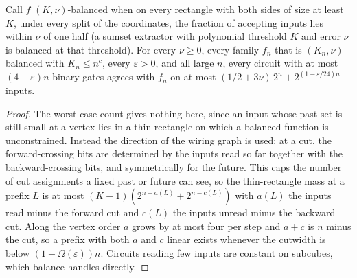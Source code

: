 \begin{theorem}
  \label{thm:lowerbounds-algebraic-cutwidth-average}
  \leanok
  Call $f$ $(K, \nu)$-balanced when on every rectangle with both sides of
  size at least $K$, under every split of the coordinates, the fraction of
  accepting inputs lies within $\nu$ of one half (a sumset extractor with
  polynomial threshold $K$ and error $\nu$ is balanced at that threshold).
  For every $\nu\ge0$, every family $f_n$ that is $(K_n, \nu)$-balanced
  with $K_n \le n^c$, every
  $\varepsilon > 0$, and all large $n$, every circuit with at most
  $(4 - \varepsilon)n$ binary gates agrees with $f_n$ on at most
  $(1/2 + 3\nu)\,2^n + 2^{(1 - \varepsilon/24)n}$ inputs.
\end{theorem}
\begin{proof}
  \leanok
  The worst-case count gives nothing here, since an input whose past set is
  still small at a vertex lies in a thin rectangle on which a balanced
  function is unconstrained. Instead the direction of the wiring graph is
  used: at a cut, the forward-crossing bits are determined by the inputs read
  so far together with the backward-crossing bits, and symmetrically for the
  future. This caps the number of cut assignments a fixed past or future can
  see, so the thin-rectangle mass at a prefix $L$ is at most
  $(K - 1)(2^{n - a(L)} + 2^{n - c(L)})$ with $a(L)$ the inputs read minus
  the forward cut and $c(L)$ the inputs unread minus the backward cut. Along
  the vertex order $a$ grows by at most four per step and $a + c$ is $n$
  minus the cut, so a prefix with both $a$ and $c$ linear exists whenever
  the cutwidth is below $(1 - \Omega(\varepsilon))n$. Circuits reading few
  inputs are constant on subcubes, which balance handles directly.
\end{proof}

